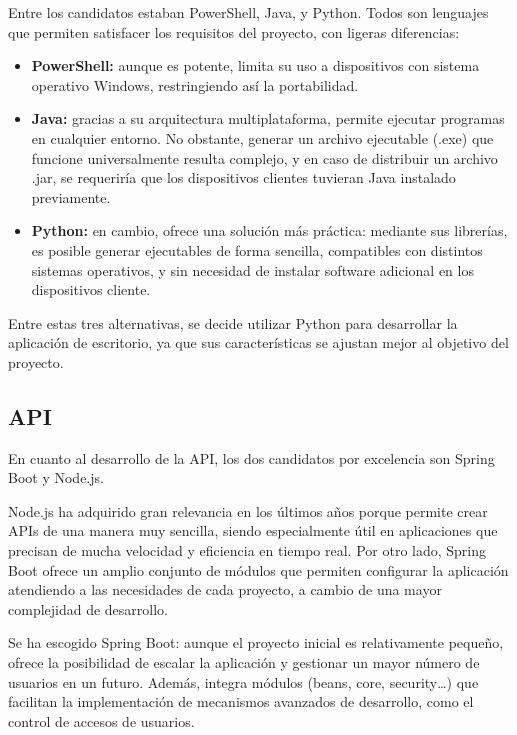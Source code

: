 Entre los candidatos estaban PowerShell, Java, y Python.
Todos son lenguajes que permiten satisfacer los requisitos del proyecto, con ligeras diferencias:
\begin{itemize}
    \item \textbf{PowerShell:} aunque es potente, limita su uso a dispositivos con sistema operativo Windows,
    restringiendo así la portabilidad.
    \item \textbf{Java:} gracias a su arquitectura multiplataforma, permite ejecutar programas en cualquier entorno.
    No obstante, generar un archivo ejecutable (.exe) que funcione universalmente resulta complejo, y en caso de
    distribuir un archivo .jar, se requeriría que los dispositivos clientes tuvieran Java instalado previamente.
    \item \textbf{Python:} en cambio, ofrece una solución más práctica: mediante sus librerías, es posible generar
    ejecutables de forma sencilla, compatibles con distintos sistemas operativos, y sin necesidad de instalar
    software adicional en los dispositivos cliente.
\end{itemize}

Entre estas tres alternativas, se decide utilizar Python\cite{python:docs} para desarrollar la aplicación de escritorio,
ya que sus características se ajustan mejor al objetivo del proyecto.

\subsection{API}\label{subsec:api}

En cuanto al desarrollo de la API, los dos candidatos por excelencia son Spring Boot y Node.js.

Node.js ha adquirido gran relevancia en los últimos años porque permite crear APIs de una manera muy sencilla,
siendo especialmente útil en aplicaciones que precisan de mucha velocidad y eficiencia en tiempo real.
Por otro lado, Spring Boot ofrece un amplio conjunto de módulos que permiten configurar la aplicación atendiendo
a las necesidades de cada proyecto, a cambio de una mayor complejidad de desarrollo.

Se ha escogido Spring Boot\cite{spring:docs}: aunque el proyecto inicial es relativamente pequeño, ofrece la  posibilidad
de escalar la aplicación y gestionar un mayor número de usuarios en un futuro.
Además, integra módulos (beans, core, security\ldots) que facilitan la implementación de mecanismos avanzados de desarrollo,
como el control de accesos de usuarios.

